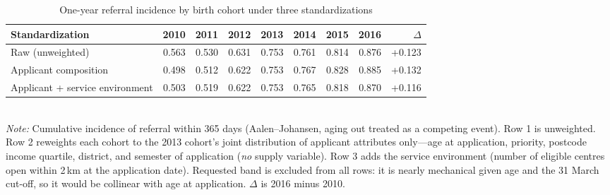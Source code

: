 \begin{table}[htbp]\centering
\caption{One-year referral incidence by birth cohort under three standardizations}
\label{tab:P3series}
\footnotesize
\setlength{\tabcolsep}{4pt}
\begin{tabular}{lrrrrrrrr}
\toprule
Standardization & 2010 & 2011 & 2012 & 2013 & 2014 & 2015 & 2016 & $\Delta$ \\
\midrule
Raw (unweighted) & 0.563 & 0.530 & 0.631 & 0.753 & 0.761 & 0.814 & 0.876 & +0.123 \\
Applicant composition & 0.498 & 0.512 & 0.622 & 0.753 & 0.767 & 0.828 & 0.885 & +0.132 \\
Applicant + service environment & 0.503 & 0.519 & 0.622 & 0.753 & 0.765 & 0.818 & 0.870 & +0.116 \\
\bottomrule
\end{tabular}
\\[3pt]{\footnotesize \textit{Note:} Cumulative incidence of referral within 365 days (Aalen--Johansen, aging out treated as a competing event). Row 1 is unweighted. Row 2 reweights each cohort to the 2013 cohort's joint distribution of applicant attributes only---age at application, priority, postcode income quartile, district, and semester of application (\emph{no} supply variable). Row 3 adds the service environment (number of eligible centres open within 2\,km at the application date). Requested band is excluded from all rows: it is nearly mechanical given age and the 31 March cut-off, so it would be collinear with age at application. $\Delta$ is 2016 minus 2010.}
\end{table}

